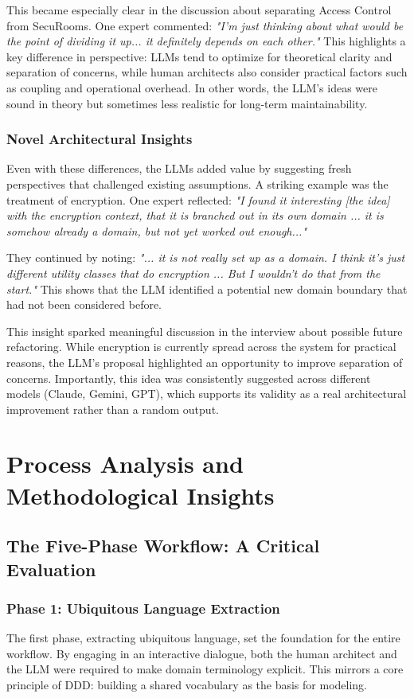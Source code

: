 This became especially clear in the discussion about separating Access Control from SecuRooms. One expert commented: \textit{"I'm just thinking about what would be the point of dividing it up... it definitely depends on each other."} This highlights a key difference in perspective: LLMs tend to optimize for theoretical clarity and separation of concerns, while human architects also consider practical factors such as coupling and operational overhead. In other words, the LLM's ideas were sound in theory but sometimes less realistic for long-term maintainability.

\subsubsection{Novel Architectural Insights}
Even with these differences, the LLMs added value by suggesting fresh perspectives that challenged existing assumptions. A striking example was the treatment of encryption. One expert reflected: \textit{"I found it interesting [the idea] with the encryption context, that it is branched out in its own domain ... it is somehow already a domain, but not yet worked out enough..."} 

They continued by noting: \textit{"... it is not really set up as a domain. I think it's just different utility classes that do encryption ... But I wouldn't do that from the start."} This shows that the LLM identified a potential new domain boundary that had not been considered before. 

This insight sparked meaningful discussion in the interview about possible future refactoring. While encryption is currently spread across the system for practical reasons, the LLM's proposal highlighted an opportunity to improve separation of concerns. Importantly, this idea was consistently suggested across different models (Claude, Gemini, GPT), which supports its validity as a real architectural improvement rather than a random output.

\section{Process Analysis and Methodological Insights}

\subsection{The Five-Phase Workflow: A Critical Evaluation}

\subsubsection{Phase 1: Ubiquitous Language Extraction}
The first phase, extracting ubiquitous language, set the foundation for the entire workflow. By engaging in an interactive dialogue, both the human architect and the LLM were required to make domain terminology explicit. This mirrors a core principle of DDD: building a shared vocabulary as the basis for modeling.  


